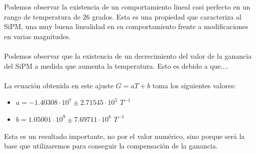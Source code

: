 \begin{itemize}
Podemos observar la existencia de un comportamiento lineal casi perfecto en un rango de temperatura de 26 grados. Esta es una propiedad que caracteriza al SiPM, una muy buena linealidad en su comportamiento frente a modificaciones en varias magnitudes.

\paragraph {}
Podemos observar que la existencia de un decrecimiento del valor de la ganancia del SiPM a medida que aumenta la temperatura. Esto es debido a que....

\paragraph {}
La ecuación obtenida en este ajuste $G=aT+b$ toma los siguientes valores: 
\begin{itemize}
\item{} $a=-1.40308 \cdot 10^7 \pm 2.71545 \cdot 10^5$ $T^{-1}$
\item{} $b=1.05001 \cdot 10^9 \pm 7.69711 \cdot 10^6$ $T^{-1}$
\end{itemize}

Esta es un resultado importante, no por el valor numérico, sino porque será la base que utilizaremos para conseguir la compensación de la ganancia.
\end{itemize}